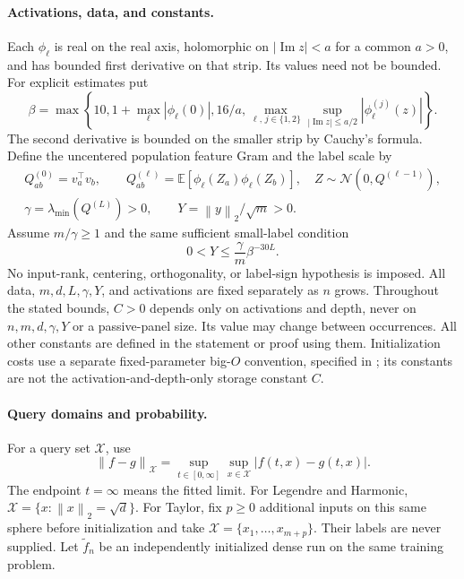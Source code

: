 \documentclass[11pt]{article}
\theoremstyle{definition}
\theoremstyle{remark}
\newcommand{\E}{\mathbb E}
\newcommand{\norm}[1]{\left\lVert#1\right\rVert}
\begin{document}
\paragraph{Activations, data, and constants.}
Each $\phi_\ell$ is real on the real axis, holomorphic on
$|\operatorname{Im}z|<a$ for a common $a>0$, and has bounded first derivative
on that strip. Its values need not be bounded. For explicit estimates put
\[
 \beta=\max\left\{10,1+\max_\ell|\phi_\ell(0)|,16/a,
 \max_{\ell,\,j\in\{1,2\}}
 \sup_{|\operatorname{Im}z|\le a/2}|\phi_\ell^{(j)}(z)|\right\}.
\]
The second derivative is bounded on the smaller strip by Cauchy's formula.
Define the uncentered population feature Gram and the label scale by
\begin{gather}
 Q^{(0)}_{ab}=v_a^\top v_b,\qquad
 Q^{(\ell)}_{ab}=\E[\phi_\ell(Z_a)\phi_\ell(Z_b)],\quad
 Z\sim\mathcal N(0,Q^{(\ell-1)}),\nonumber\\
 \gamma=\lambda_{\min}(Q^{(L)})>0,\qquad
 Y=\norm{y}_2/\sqrt m>0.
 \label{cp:data}
\end{gather}
Assume $m/\gamma\ge1$ and the same sufficient small-label condition
\begin{equation}
 0<Y\le\frac\gamma m\beta^{-30L}.
 \label{cp:labels}
\end{equation}
No input-rank, centering, orthogonality, or label-sign hypothesis is imposed.
All data, $m,d,L,\gamma,Y$, and activations are fixed separately as $n$ grows.
Throughout the stated bounds, $C>0$ depends only on activations and depth, never on
$n,m,d,\gamma,Y$ or a passive-panel size. Its value may change between occurrences.
All other constants are defined in the statement or proof using them.
Initialization costs use a separate fixed-parameter big-$O$ convention,
specified in ; its constants are not the
activation-and-depth-only storage constant $C$.

\paragraph{Query domains and probability.}
For a query set $\mathcal X$, use
\begin{equation}
 \norm{f-g}_{\mathcal X}
   =\sup_{t\in[0,\infty]}\sup_{x\in\mathcal X}|f(t,x)-g(t,x)|.
 \label{cp:norm}
\end{equation}
The endpoint $t=\infty$ means the fitted limit. For Legendre and Harmonic,
$\mathcal X=\{x:\norm{x}_2=\sqrt d\}$. For Taylor, fix $p\ge0$
additional inputs on this same sphere before initialization and take
$\mathcal X=\{x_1,\ldots,x_{m+p}\}$. Their labels are never supplied.
Let $\widetilde f_n$ be an independently initialized dense run on the same
training problem.
\end{document}
